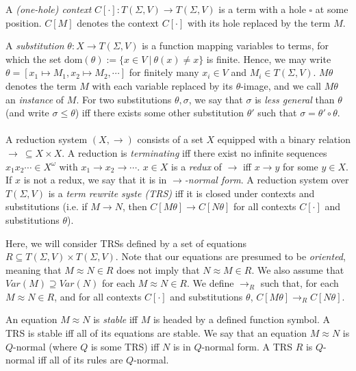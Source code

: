 \documentclass{article}
\begin{document}
A \emph{(one-hole) context} $C[\cdot] : T(\Sigma, V) \rightarrow T(\Sigma, V)$ is a term with a hole $\square$ at some position. $C[M]$ denotes the context $C[\cdot]$ with its hole replaced by the term $M$. 

A \emph{substitution} $\theta : X \rightarrow T(\Sigma, V)$ is a function mapping variables to terms, for which the set $\text{dom}(\theta) := \{ x \in V ~|~ \theta(x) \neq x\}$ is finite. Hence, we may write $\theta = [x_1 \mapsto M_1, x_2 \mapsto M_2, \cdots]$ for finitely many $x_i \in V$ and $M_i \in T(\Sigma,V)$. $M \theta$ denotes the term $M$ with each variable replaced by its $\theta$-image, and we call $M\theta$ an \emph{instance} of $M$. For two substitutions $\theta, \sigma$, we say that $\sigma$ is \emph{less general} than $\theta$ (and write $\sigma \leq \theta$) iff there exists some other substitution $\theta'$ such that $\sigma = \theta' \circ \theta$.
\\~\\
A reduction system $(X, \rightarrow)$ consists of a set $X$ equipped with a binary relation $\rightarrow ~\subseteq X \times X$. A reduction is \emph{terminating} iff there exist no infinite sequences $x_1x_2 \cdots \in X^\omega$ with $x_1 \rightarrow x_2 \rightarrow \cdots$. $x \in X$ is a \emph{redux} of $\rightarrow$ iff $x \rightarrow y$ for some $y \in X$. If $x$ is not a redux, we say that it is in \emph{$\rightarrow$-normal form}. A reduction system over $T(\Sigma, V)$ is a \emph{term rewrite syste (TRS)} iff it is closed under contexts and substitutions (i.e. if $M \rightarrow N$, then $C[M\theta] \rightarrow C[N\theta]$ for all contexts $C[\cdot]$ and substitutions $\theta$). 

Here, we will consider TRSs defined by a set of equations $R \subseteq T(\Sigma, V) \times T(\Sigma, V)$. Note that our equations are presumed to be \emph{oriented}, meaning that $M \approx N \in R$ does not imply that $N \approx M \in R$. We also assume that $Var(M) \supseteq Var(N)$ for each $M \approx N \in R$. We define $\rightarrow_R$ such that, for each $M \approx N \in R$, and for all contexts $C[\cdot]$ and substitutions $\theta$, $C[M\theta] \rightarrow_R C[N\theta]$. 

An equation $M \approx N$ is \emph{stable} iff $M$ is headed by a defined function symbol. A TRS is stable iff all of its equations are stable. We say that an equation $M \approx N$ is $Q$-normal (where $Q$ is some TRS) iff $N$ is in $Q$-normal form. A TRS $R$ is $Q$-normal iff all of its rules are $Q$-normal.  
\end{document}
